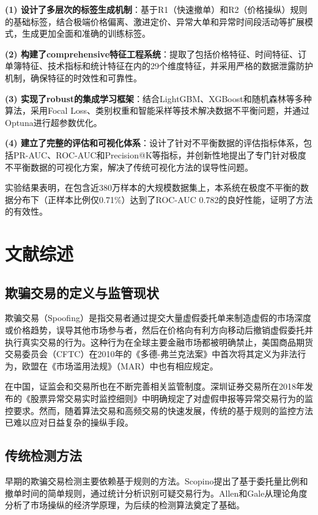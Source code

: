 \documentclass[12pt,a4paper]{article}
\begin{document}
\textbf{(1) 设计了多层次的标签生成机制}：基于R1（快速撤单）和R2（价格操纵）规则的基础标签，结合极端价格偏离、激进定价、异常大单和异常时间段活动等扩展模式，生成更加全面和准确的训练标签。

\textbf{(2) 构建了comprehensive特征工程系统}：提取了包括价格特征、时间特征、订单簿特征、技术指标和统计特征在内的29个维度特征，并采用严格的数据泄露防护机制，确保特征的时效性和可靠性。

\textbf{(3) 实现了robust的集成学习框架}：结合LightGBM、XGBoost和随机森林等多种算法，采用Focal Loss、类别权重和智能采样等技术解决数据不平衡问题，并通过Optuna进行超参数优化。

\textbf{(4) 建立了完整的评估和可视化体系}：设计了针对不平衡数据的评估指标体系，包括PR-AUC、ROC-AUC和Precision@K等指标，并创新性地提出了专门针对极度不平衡数据的可视化方案，解决了传统可视化方法的误导性问题。

实验结果表明，在包含近380万样本的大规模数据集上，本系统在极度不平衡的数据分布下（正样本比例仅0.71\%）达到了ROC-AUC 0.782的良好性能，证明了方法的有效性。

\section{文献综述}

\subsection{欺骗交易的定义与监管现状}

欺骗交易（Spoofing）是指交易者通过提交大量虚假委托单来制造虚假的市场深度或价格趋势，误导其他市场参与者，然后在价格向有利方向移动后撤销虚假委托并执行真实交易的行为\cite{cartea2018algorithmic}。这种行为在全球主要金融市场都被明确禁止，美国商品期货交易委员会（CFTC）在2010年的《多德-弗兰克法案》中首次将其定义为非法行为，欧盟在《市场滥用法规》（MAR）中也有相应规定。

在中国，证监会和交易所也在不断完善相关监管制度。深圳证券交易所在2018年发布的《股票异常交易实时监控细则》中明确规定了对虚假申报等异常交易行为的监控要求。然而，随着算法交易和高频交易的快速发展，传统的基于规则的监控方法已难以应对日益复杂的操纵手段。

\subsection{传统检测方法}

早期的欺骗交易检测主要依赖基于规则的方法。Scopino\cite{scopino2015regulatory}提出了基于委托量比例和撤单时间的简单规则，通过统计分析识别可疑交易行为。Allen和Gale\cite{allen1992stock}从理论角度分析了市场操纵的经济学原理，为后续的检测算法奠定了基础。
\end{document}
